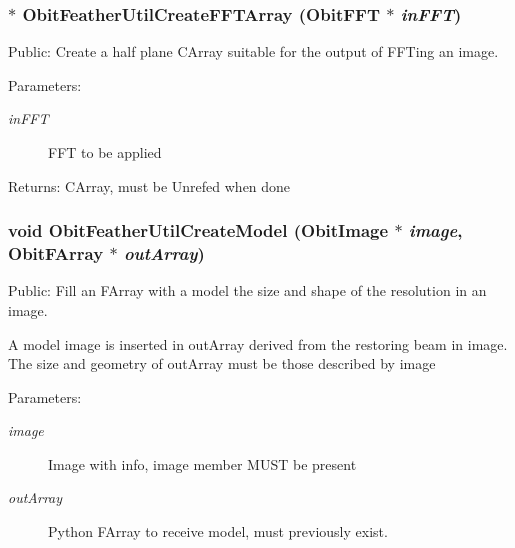 \subsubsection{$\ast$ Obit\-Feather\-Util\-Create\-FFTArray ({\bf Obit\-FFT} $\ast$ {\em in\-FFT})}\label{ObitFeatherUtil_8c_a1}


Public: Create a half plane CArray suitable for the output of FFTing an image. 

\begin{Desc}
\item[Parameters:]
\begin{description}
\item[{\em in\-FFT}]FFT to be applied \end{description}
\end{Desc}
\begin{Desc}
\item[Returns:]CArray, must be Unrefed when done \end{Desc}
\subsubsection{\setlength{\rightskip}{0pt plus 5cm}void Obit\-Feather\-Util\-Create\-Model ({\bf Obit\-Image} $\ast$ {\em image}, {\bf Obit\-FArray} $\ast$ {\em out\-Array})}\label{ObitFeatherUtil_8c_a8}


Public: Fill an FArray with a model the size and shape of the resolution in an image. 

A model image is inserted in out\-Array derived from the restoring beam in image. The size and geometry of out\-Array must be those described by image \begin{Desc}
\item[Parameters:]
\begin{description}
\item[{\em image}]Image with info, image member MUST be present \item[{\em out\-Array}]Python FArray to receive model, must previously exist. \end{description}
\end{Desc}
